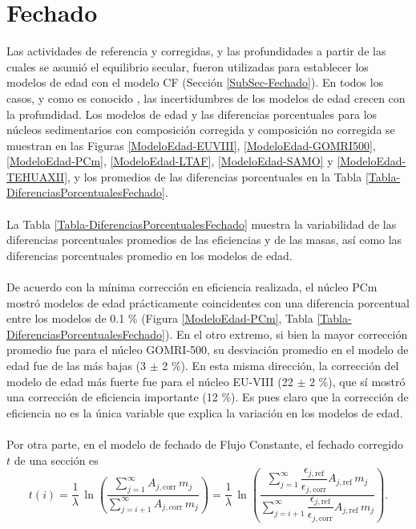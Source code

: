 	\section{Fechado}\label{Seccion-Fechado}
Las actividades de referencia y corregidas, y las profundidades a partir de las cuales se asumió el equilibrio secular, fueron utilizadas para establecer los modelos de edad con el modelo CF (Sección \ref{SubSec-Fechado}). En todos los casos, y como es conocido \cite{SANCHEZCABEZA2012183}, las incertidumbres de los modelos de edad crecen con la profundidad. Los modelos de edad y las diferencias porcentuales para los núcleos sedimentarios con composición corregida y composición no corregida se muestran en las Figuras \ref{ModeloEdad-EUVIII}, \ref{ModeloEdad-GOMRI500}, \ref{ModeloEdad-PCm}, \ref{ModeloEdad-LTAF}, \ref{ModeloEdad-SAMO} y \ref{ModeloEdad-TEHUAXII}, y los promedios de las diferencias porcentuales en la Tabla \ref{Tabla-DiferenciasPorcentualesFechado}. 
\\
\\
La Tabla \ref{Tabla-DiferenciasPorcentualesFechado} muestra la variabilidad de las diferencias porcentuales promedios de las eficiencias y de las masas, así como las diferencias porcentuales promedio en los modelos de edad. 
\\
\\
De acuerdo con la mínima corrección en eficiencia realizada, el núcleo PCm mostró modelos de edad prácticamente coincidentes con una diferencia porcentual entre los modelos de 0.1 \% (Figura \ref{ModeloEdad-PCm}, Tabla \ref{Tabla-DiferenciasPorcentualesFechado}). En el otro extremo, si bien la mayor corrección promedio fue para el núcleo GOMRI-500, su desviación promedio en el modelo de edad fue de las más bajas (3 $\pm$ 2 \%). En esta misma dirección, la corrección del modelo de edad más fuerte fue para el núcleo EU-VIII (22 $\pm$ 2 \%), que sí mostró una corrección de eficiencia importante (12 \%). Es pues claro que la corrección de eficiencia no es la única variable que explica la variación en los modelos de edad. 
\\
\\
Por otra parte, en el modelo de fechado de Flujo Constante, el fechado corregido $t$ de una sección es 
\begin{equation}
t(i) =  \dfrac{1}{\lambda}\,\ln\left(\dfrac{\sum_{j=1}^\infty A_{j, \text{corr}}\, m_j}{ \sum_{j=i+1}^\infty A_{j, \text{corr}}\, m_j}\right) = 
\dfrac{1}{\lambda}\,\ln\left(\dfrac{\sum_{j=1}^\infty \dfrac{\epsilon_{j, \text{ref}}}{\epsilon_{j, \text{corr}}} A_{j, \text{ref}}\, m_j}{ \sum_{j=i+1}^\infty \dfrac{\epsilon_{j, \text{ref}}}{\epsilon_{j, \text{corr}}} A_{j, \text{ref}}\, m_j}\right).
\end{equation}
